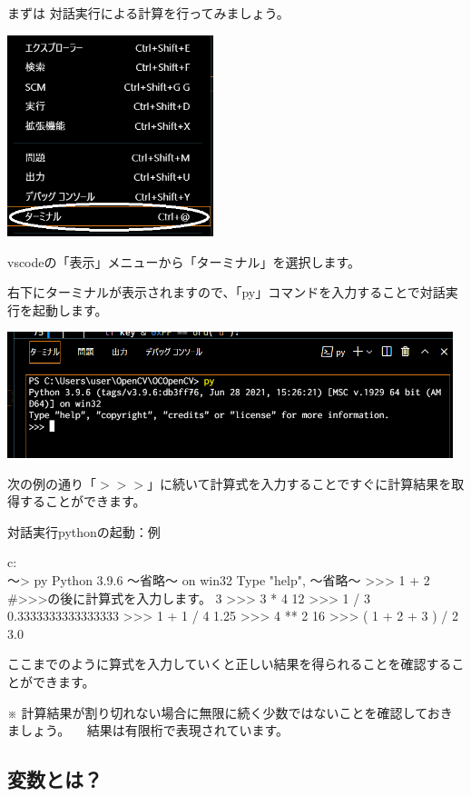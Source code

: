 \documentclass[11pt,a4paper,dvipdfmx,titlepage]{jsreport}
\begin{document}
 まずは {\gt 対話実行}による計算を行ってみましょう。

\includegraphics[width=6cm]{images/image1.png}

vscodeの「表示」メニューから「ターミナル」を選択します。

右下にターミナルが表示されますので、「py」コマンドを入力することで対話実行を起動します。

\includegraphics[width=13cm]{images/image7.png}

次の例の通り「$>>>$」に続いて計算式を入力することですぐに計算結果を取得することができます。

\begin{grabox}{対話実行pythonの起動：例}
\begin{listingcont}
c:\\～> py
Python 3.9.6 ～省略～ on win32
Type "help", ～省略～
>>> 1 + 2 #>>>の後に計算式を入力します。
3
>>> 3 * 4
12
>>> 1 / 3
0.3333333333333333
>>> 1 +  1 / 4 
1.25
>>> 4 ** 2
16
>>> ( 1 + 2 + 3 ) / 2
3.0
\end{listingcont}
\end{grabox}

ここまでのように算式を入力していくと正しい結果を得られることを確認することができます。

※ 計算結果が割り切れない場合に無限に続く少数ではないことを確認しておきましょう。
　結果は有限桁で表現されています。

\subsection{変数とは？}
\end{document}
